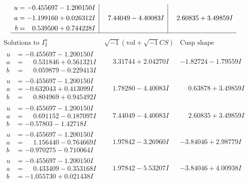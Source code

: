 \documentclass[1p]{elsarticle_modified}
\theoremstyle{definition}
\newcommand{\I}{\sqrt{-1}}
\begin{document}
$$\begin{array}{c|c|c}
\begin{aligned}
u &= -0.455697 - 1.200150 I \\
a &= -1.199160 + 0.026312 I \\
b &= \phantom{-}0.539500 + 0.744228 I\end{aligned}
 & \phantom{-}7.44049 - 4.40083 I & \phantom{-}2.60835 + 3.49859 I\\
 \hline 
 \end{array}$$\newpage$$\begin{array}{c|c|c}  
\text{Solutions to }I^u_{2}& \I (\text{vol} + \sqrt{-1}CS) & \text{Cusp shape}\\
 \hline 
\begin{aligned}
u &= -0.455697 - 1.200150 I \\
a &= \phantom{-}0.531846 + 0.561321 I \\
b &= \phantom{-}0.059879 - 0.229413 I\end{aligned}
 & \phantom{-}3.31744 + 2.04270 I & -1.82724 - 1.79559 I \\ \hline\begin{aligned}
u &= -0.455697 - 1.200150 I \\
a &= -0.632043 + 0.413099 I \\
b &= \phantom{-}0.804969 + 0.945492 I\end{aligned}
 & \phantom{-}1.78280 - 4.40083 I & \phantom{-}0.63878 + 3.49859 I \\ \hline\begin{aligned}
u &= -0.455697 - 1.200150 I \\
a &= \phantom{-}0.691152 - 0.187097 I \\
b &= -0.57803 - 1.42718 I\end{aligned}
 & \phantom{-}7.44049 - 4.40083 I & \phantom{-}2.60835 + 3.49859 I \\ \hline\begin{aligned}
u &= -0.455697 - 1.200150 I \\
a &= \phantom{-}1.156440 - 0.764669 I \\
b &= -0.970275 - 0.710064 I\end{aligned}
 & \phantom{-}1.97842 - 3.26960 I & -3.84046 + 2.98779 I \\ \hline\begin{aligned}
u &= -0.455697 - 1.200150 I \\
a &= \phantom{-}0.433409 - 0.353168 I \\
b &= -1.055730 + 0.021438 I\end{aligned}
 & \phantom{-}1.97842 - 5.53207 I & -3.84046 + 4.00938 I \\ \hline\begin{aligned}

\end{aligned}
\end{array}$$
\end{document}
